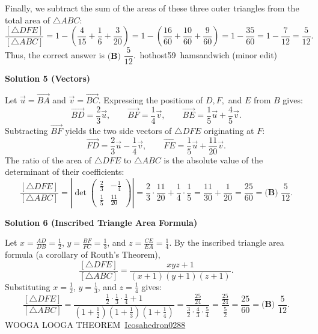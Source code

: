 \begin{enumerate}
 Finally, we subtract the sum of the areas of these three outer triangles from the total area of $\triangle ABC$:
 \[\frac{[\triangle DFE]}{[\triangle ABC]} = 1 - \left(\frac{4}{15} + \frac{1}{6} + \frac{3}{20}\right) = 1 - \left(\frac{16}{60} + \frac{10}{60} + \frac{9}{60}\right) = 1 - \frac{35}{60} = 1 - \frac{7}{12} = \frac{5}{12}.\]Thus, the correct answer is $\boxed{\textbf{(B) } \dfrac{5}{12}}$.~hothost59~hamsandwich (minor edit)

 



\textbf{Solution 5 (Vectors)}

Let $\vec{u} = \overrightarrow{BA}$ and $\vec{v} = \overrightarrow{BC}$. Expressing the positions of $D, F,$ and $E$ from $B$ gives:
 \[\overrightarrow{BD} = \frac{2}{3}\vec{u}, \qquad \overrightarrow{BF} = \frac{1}{4}\vec{v}, \qquad \overrightarrow{BE} = \frac{1}{5}\vec{u} + \frac{4}{5}\vec{v}.\]Subtracting $\overrightarrow{BF}$ yields the two side vectors of $\triangle DFE$ originating at $F$:
 \[\overrightarrow{FD} = \frac{2}{3}\vec{u} - \frac{1}{4}\vec{v}, \qquad \overrightarrow{FE} = \frac{1}{5}\vec{u} + \frac{11}{20}\vec{v}.\]The ratio of the area of $\triangle DFE$ to $\triangle ABC$ is the absolute value of the determinant of their coefficients:
 \[\frac{[\triangle DFE]}{[\triangle ABC]} = \left|\det \begin{pmatrix} \frac{2}{3} & -\frac{1}{4} \\ \frac{1}{5} & \frac{11}{20} \end{pmatrix}\right| = \frac{2}{3} \cdot \frac{11}{20} + \frac{1}{4} \cdot \frac{1}{5} = \frac{11}{30} + \frac{1}{20} = \frac{25}{60} = \boxed{\textbf{(B) } \dfrac{5}{12}}.\]




\textbf{Solution 6 (Inscribed Triangle Area Formula)}

Let $x = \frac{AD}{DB} = \frac{1}{2}$, $y = \frac{BF}{FC} = \frac{1}{3}$, and $z = \frac{CE}{EA} = \frac{1}{4}$. By the inscribed triangle area formula (a corollary of Routh's Theorem),
 \[\frac{[\triangle DFE]}{[\triangle ABC]} = \frac{xyz + 1}{(x + 1)(y + 1)(z + 1)}.\]Substituting $x = \frac{1}{2}$, $y = \frac{1}{3}$, and $z = \frac{1}{4}$ gives:
 \[\frac{[\triangle DFE]}{[\triangle ABC]} = \frac{\frac{1}{2} \cdot \frac{1}{3} \cdot \frac{1}{4} + 1}{\left(1 + \frac{1}{2}\right)\left(1 + \frac{1}{3}\right)\left(1 + \frac{1}{4}\right)} = \frac{\frac{25}{24}}{\frac{3}{2} \cdot \frac{4}{3} \cdot \frac{5}{4}} = \frac{\frac{25}{24}}{\frac{5}{2}} = \frac{25}{60} = \boxed{\textbf{(B) } \dfrac{5}{12}}.\]WOOGA LOOGA THEOREM~\href{https://artofproblemsolving.com/wiki/index.php?title=User\%EF\%BC\%9AIcosahedron0288\#Created\_Pages}{Icosahedron0288}


\end{enumerate}
